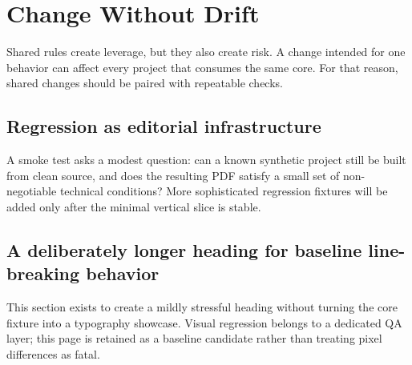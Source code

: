 \chapter{Change Without Drift}

Shared rules create leverage, but they also create risk. A change intended for one behavior can affect every project that consumes the same core. For that reason, shared changes should be paired with repeatable checks.

\section{Regression as editorial infrastructure}

A smoke test asks a modest question: can a known synthetic project still be built from clean source, and does the resulting PDF satisfy a small set of non-negotiable technical conditions? More sophisticated regression fixtures will be added only after the minimal vertical slice is stable.

\section{A deliberately longer heading for baseline line-breaking behavior}

This section exists to create a mildly stressful heading without turning the core fixture into a typography showcase. Visual regression belongs to a dedicated QA layer; this page is retained as a baseline candidate rather than treating pixel differences as fatal.
